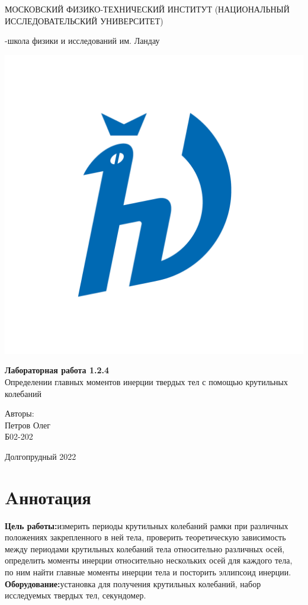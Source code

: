 \documentclass[a4paper,12pt]{article} %
\begin{document}
\begin{titlepage}
\begin{center}
    {\large МОСКОВСКИЙ ФИЗИКО-ТЕХНИЧЕСКИЙ ИНСТИТУТ (НАЦИОНАЛЬНЫЙ ИССЛЕДОВАТЕЛЬСКИЙ УНИВЕРСИТЕТ)}
\end{center}
\begin{center}
    {-школа физики и исследований им. Ландау}
\end{center}

\vspace{3.5cm}

\begin{center}
    \includegraphics[width=0.4\linewidth]{hv_full.png}
\end{center}
\vspace{0.1cm}
{\huge
\begin{center}
    {\bf Лабораторная работа 1.2.4}\\
    Определении главных моментов инерции твердых тел с помощью крутильных колебаний
\end{center}
}
\vspace{2cm}
\begin{flushright}
{\LARGE Авторы:\\ Петров Олег \\
\vspace{0.2cm}
Б02-202}
\end{flushright}
\vspace{3.5cm}
\begin{center}
    Долгопрудный 2022
\end{center}
\end{titlepage}

\section{Aннотация}
\textbf{Цель работы:}измерить периоды крутильных колебаний рамки при различных положениях закрепленного
в ней тела, проверить теоретическую зависимость между периодами крутильных колебаний тела
относительно различных осей, определить моменты инерции относительно нескольких осей для каждого тела, 
по ним найти главные моменты инерции тела и посторить эллипсоид инерции.\\
\textbf{Оборудование:}установка для получения крутильных колебаний, набор исследуемых твердых тел, секундомер.
\end{document}
